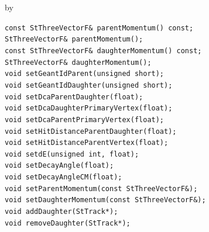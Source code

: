 \documentclass[twoside]{article}
\newcommand{\entrylabel}[1]{\mbox{\textbf{{#1}}}\hfil}%
\newenvironment{entry}
{\begin{list}{}%
    {\renewcommand{\makelabel}{\entrylabel}%
     \setlength{\labelwidth}{90pt}%
     \setlength{\leftmargin}{\labelwidth}
     \advance\leftmargin by \labelsep%
      }%
    }%
  {\end{list}}
\newcommand{\Entrylabel}[1]%
{\raisebox{0pt}[1ex][0pt]{\makebox[\labelwidth][l]%
    {\parbox[t]{\labelwidth}{\hspace{0pt}\textbf{{#1}}}}}}
\newenvironment{Entry}%
{\renewcommand{\entrylabel}{\Entrylabel}\begin{entry}}%
  {\end{entry}}
\begin{document}
\begin{Entry}
    \verb+const StThreeVectorF& parentMomentum() const;+\\
    \verb+StThreeVectorF& parentMomentum();+\\
    \verb+const StThreeVectorF& daughterMomentum() const;+\\
    \verb+StThreeVectorF& daughterMomentum();+\\
    \verb+void setGeantIdParent(unsigned short);+\\
    \verb+void setGeantIdDaughter(unsigned short);+\\
    \verb+void setDcaParentDaughter(float);+\\
    \verb+void setDcaDaughterPrimaryVertex(float);+\\
    \verb+void setDcaParentPrimaryVertex(float);+\\
    \verb+void setHitDistanceParentDaughter(float);+\\
    \verb+void setHitDistanceParentVertex(float);+\\
    \verb+void setdE(unsigned int, float);+\\
    \verb+void setDecayAngle(float);+\\
    \verb+void setDecayAngleCM(float);+\\
    \verb+void setParentMomentum(const StThreeVectorF&);+\\
    \verb+void setDaughterMomentum(const StThreeVectorF&);+\\
    \verb+void addDaughter(StTrack*);+\\
    \verb+void removeDaughter(StTrack*);+\\
\end{Entry}
\clearpage
\end{document}
